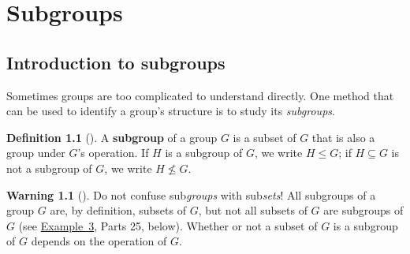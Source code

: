 \documentclass[10pt,]{book}
\newcommand{\terminology}[1]{\textbf{#1}}
\theoremstyle{plain}
\theoremstyle{definition}
\newtheorem{definition}[theorem]{Definition}
\theoremstyle{definition}
\newtheorem{warning}[theorem]{Warning}
\theoremstyle{definition}
\theoremstyle{definition}
\numberwithin{equation}{section}
\begin{document}
\chapter[{Subgroups}]{Subgroups}\label{subgps}
\typeout{************************************************}
\typeout{************************************************}
\section[{Introduction to subgroups}]{Introduction to subgroups}\label{section-13}
Sometimes groups are too complicated to understand directly. One method that can be used to identify a group's structure is to study its \emph{subgroups}.%
\begin{definition}[{}]\label{definition-36}
A \terminology{subgroup} of a group \(G\) is a subset of \(G\) that is also a group under \(G\)'s operation. If \(H\) is a subgroup of \(G\), we write \(H \leq G\); if \(H\subseteq G\) is not a subgroup of \(G\), we write \(H\not\leq G\).%
\end{definition}
\begin{warning}[]\label{warning-14}
Do not confuse sub\emph{groups} with sub\emph{sets}! All subgroups of a group \(G\) are, by definition, subsets of \(G\), but not all subsets of \(G\) are subgroups of \(G\) (see \hyperref[subsetvsubgp1]{Example~3}, Parts 2\textendash{}5, below). Whether or not a subset of \(G\) is a subgroup of \(G\) depends on the operation of \(G\).%
\end{warning}
\end{document}
